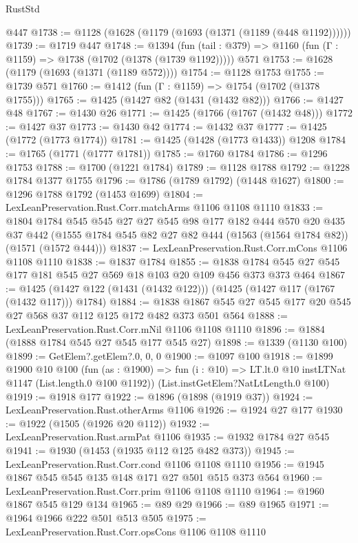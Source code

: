 \begin{lexlean}{RustStd}
\begin{coremodule}
    @447
@1738 := @1128 (@1628 (@1179 (@1693 (@1371 (@1189 (@448 @1192))))))
@1739 := @1719 @447
@1748 := @1394
    (fun (tail : @379) => @1160 (fun (Γ : @1159) => @1738 (@1702 (@1378 (@1739 @1192)))))
    @571
@1753 := @1628 (@1179 (@1693 (@1371 (@1189 @572))))
@1754 := @1128 @1753
@1755 := @1739 @571
@1760 := @1412 (fun (Γ : @1159) => @1754 (@1702 (@1378 @1755)))
@1765 := @1425 (@1427 @82 (@1431 (@1432 @82)))
@1766 := @1427 @48
@1767 := @1430 @26
@1771 := @1425 (@1766 (@1767 (@1432 @48)))
@1772 := @1427 @37
@1773 := @1430 @42
@1774 := @1432 @37
@1777 := @1425 (@1772 (@1773 @1774))
@1781 := @1425 (@1428 (@1773 @1433)) @1208
@1784 := @1765 (@1771 (@1777 @1781))
@1785 := @1760 @1784
@1786 := @1296 @1753
@1788 := @1700 (@1221 @1784)
@1789 := @1128 @1788
@1792 := @1228 @1784 @1377 @1755
@1796 := @1786 (@1789 @1792) (@1448 @1627)
@1800 := @1296 @1788 @1792 (@1453 @1699)
@1804 := LexLeanPreservation.Rust.Corr.matchArms @1106 @1108 @1110
@1833 := @1804
    @1784
    @545
    @545
    @27
    @27
    @545
    @98
    @177
    @182
    @444
    @570
    @20
    @435
    @37
    @442
    (@1555 @1784 @545 @82 @27 @82 @444 (@1563 (@1564 @1784 @82)) (@1571 (@1572 @444)))
@1837 := LexLeanPreservation.Rust.Corr.mCons @1106 @1108 @1110
@1838 := @1837 @1784
@1855 := @1838 @1784 @545 @27 @545 @177 @181 @545 @27 @569 @18 @103 @20 @109 @456 @373 @373 @464
@1867 := @1425 (@1427 @122 (@1431 (@1432 @122))) (@1425 (@1427 @117 (@1767 (@1432 @117))) @1784)
@1884 := @1838 @1867 @545 @27 @545 @177 @20 @545 @27 @568 @37 @112 @125 @172 @482 @373 @501 @564
@1888 := LexLeanPreservation.Rust.Corr.mNil @1106 @1108 @1110
@1896 := @1884 (@1888 @1784 @545 @27 @545 @177 @545 @27)
@1898 := @1339 (@1130 @100)
@1899 := GetElem?.getElem?.{0, 0, 0}
@1900 := @1097 @100
@1918 := @1899
    @1900
    @10
    @100
    (fun (as : @1900) =>
    fun (i : @10) => LT.lt.{0} @10 instLTNat @1147 (List.length.{0} @100 @1192))
    (List.instGetElem?NatLtLength.{0} @100)
@1919 := @1918 @177
@1922 := @1896 (@1898 (@1919 @37))
@1924 := LexLeanPreservation.Rust.otherArms @1106
@1926 := @1924 @27 @177
@1930 := @1922 (@1505 (@1926 @20 @112))
@1932 := LexLeanPreservation.Rust.armPat @1106
@1935 := @1932 @1784 @27 @545
@1941 := @1930 (@1453 (@1935 @112 @125 @482 @373))
@1945 := LexLeanPreservation.Rust.Corr.cond @1106 @1108 @1110
@1956 := @1945 @1867 @545 @545 @135 @148 @171 @27 @501 @515 @373 @564
@1960 := LexLeanPreservation.Rust.Corr.prim @1106 @1108 @1110
@1964 := @1960 @1867 @545 @129 @134
@1965 := @89 @29
@1966 := @89 @1965
@1971 := @1964 @1966 @222 @501 @513 @505
@1975 := LexLeanPreservation.Rust.Corr.opsCons @1106 @1108 @1110

\end{coremodule}
\end{lexlean}
